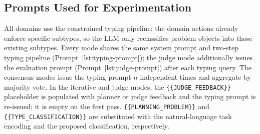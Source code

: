 \renewcommand{\lstlistingname}{Prompt}
\subsection{Prompts Used for Experimentation}
\label{app:prompts}
All domains use the constrained typing pipeline: the domain actions already enforce specific subtypes, so the LLM only reclassifies problem objects into those existing subtypes. Every mode shares the same system prompt and two-step typing pipeline (Prompt~\ref{lst:typing-prompt}); the judge mode additionally issues the evaluation prompt (Prompt~\ref{lst:judge-prompt}) after each typing query. The consensus modes issue the typing prompt $n$ independent times and aggregate by majority vote. In the iterative and judge modes, the \texttt{\{\{JUDGE\_FEEDBACK\}\}} placeholder is populated with planner or judge feedback and the typing prompt is re-issued; it is empty on the first pass. \texttt{\{\{PLANNING\_PROBLEM\}\}} and \texttt{\{\{TYPE\_CLASSIFICATION\}\}} are substituted with the natural-language task encoding and the proposed classification, respectively.

